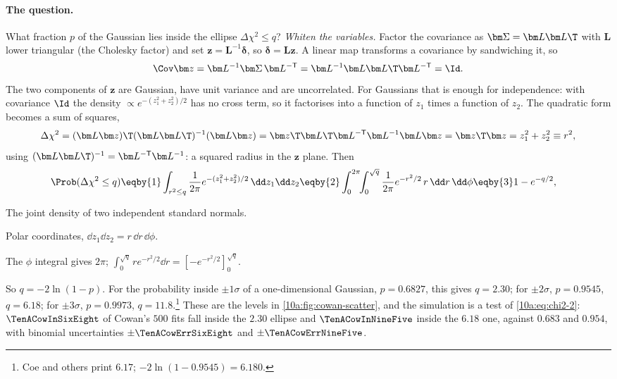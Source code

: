 \paragraph{The question.} What fraction $p$ of the Gaussian lies inside the ellipse $\Delta\chi^2\le q$?
\emph{Whiten the variables.} Factor the covariance as $\bm\Sigma=\bm L\bm L\T$ with $\bm L$ lower triangular (the
Cholesky factor) and set $\bm z=\bm L^{-1}\bm\delta$, so $\bm\delta=\bm L\bm z$. A linear map transforms a covariance by
sandwiching it, so
\[
  \Cov\bm z=\bm L^{-1}\bm\Sigma\,\bm L^{-\mathsf T}=\bm L^{-1}\bm L\bm L\T\bm L^{-\mathsf T}=\Id .
\]
The two components of $\bm z$ are Gaussian, have unit variance and are uncorrelated. For Gaussians that is
enough for independence: with covariance $\Id$ the density $\propto e^{-(z_1^2+z_2^2)/2}$ has no cross term, so it
factorises into a function of $z_1$ times a function of $z_2$. The quadratic form becomes a sum of squares,
\[
  \Delta\chi^2=(\bm L\bm z)\T(\bm L\bm L\T)^{-1}(\bm L\bm z)
  =\bm z\T\bm L\T\bm L^{-\mathsf T}\bm L^{-1}\bm L\bm z=\bm z\T\bm z=z_1^2+z_2^2\equiv r^2,
\]
using $(\bm L\bm L\T)^{-1}=\bm L^{-\mathsf T}\bm L^{-1}$: a squared radius in the $\bm z$ plane. Then
\begin{align}
  \Prob(\Delta\chi^2\le q)
  &\eqby{1}\int_{r^2\le q}\frac{1}{2\pi}e^{-(z_1^2+z_2^2)/2}\,\dd z_1\dd z_2
  \eqby{2}\int_0^{2\pi}\!\!\int_0^{\sqrt q}\frac{1}{2\pi}e^{-r^2/2}\,r\,\dd r\,\dd\phi
  \eqby{3}1-e^{-q/2},
  \label{10a:eq:chi2-2}
\end{align}
\begin{explain}
  \item The joint density of two independent standard normals.
  \item Polar coordinates, $\dd z_1\dd z_2=r\,\dd r\,\dd\phi$.
  \item The $\phi$ integral gives $2\pi$; $\int_0^{\sqrt q}re^{-r^2/2}\dd r=[-e^{-r^2/2}]_0^{\sqrt q}$.
\end{explain}
So $q=-2\ln(1-p)$. For the probability inside $\pm1\sigma$ of a one-dimensional Gaussian, $p=0.6827$, this gives
$q=2.30$; for $\pm2\sigma$, $p=0.9545$, $q=6.18$; for $\pm3\sigma$, $p=0.9973$, $q=11.8$.\footnote{Coe
\cite{Coe2009} and others print $6.17$; $-2\ln(1-0.9545)=6.180$.} These are the levels in
\cref{10a:fig:cowan-scatter}, and the simulation is a test of \eqref{10a:eq:chi2-2}: $\TenACowInSixEight$ of Cowan's
$500$ fits fall inside the $2.30$ ellipse and $\TenACowInNineFive$ inside the $6.18$ one, against $0.683$ and
$0.954$, with binomial uncertainties $\pm\TenACowErrSixEight$ and $\pm\TenACowErrNineFive$.

